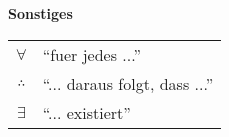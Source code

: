 \begin{center}\textbf{Sonstiges}\end{center}
\begin{tabular}{cl}
  $\forall$ & ``fuer jedes ...'' \\
  $\therefore$ & ``... daraus folgt, dass ...'' \\
  $\exists$ & ``... existiert'' \\
\end{tabular}

\pagebreak

